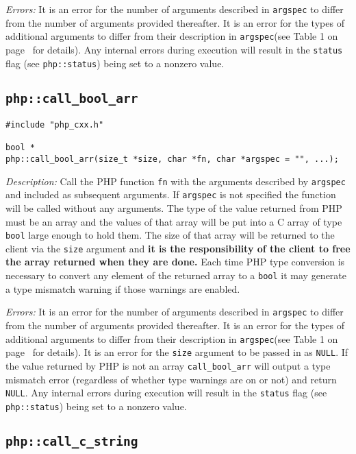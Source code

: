 \documentclass[11pt,titlepage]{article}
\begin{document}
\emph{Errors:} It is an error for the number of arguments described in \verb|argspec| to differ from the number of arguments provided thereafter. It is an error for the types of additional arguments to differ from their description in \verb|argspec|(see Table 1 on page~\pageref{Table1} for details). Any internal errors during execution will result in the \verb|status| flag (see \verb|php::status|) being set to a nonzero value.


\subsection{\texttt{php::call\_bool\_arr}}

\begin{verbatim}
#include "php_cxx.h"

bool *
php::call_bool_arr(size_t *size, char *fn, char *argspec = "", ...);
\end{verbatim}

\emph{Description:} Call the PHP function \verb|fn| with the arguments described by \verb|argspec| and included as subsequent arguments. If \verb|argspec| is not specified the function will be called without any arguments. The type of the value returned from PHP must be an array and the values of that array will be put into a C array of type \verb|bool| large enough to hold them. The size of that array will be returned to the client via the \verb|size| argument and \textbf{it is the responsibility of the client to free the array returned when they are done.} Each time PHP type conversion is necessary to convert any element of the returned array to a \verb|bool| it may generate a type mismatch warning if those warnings are enabled.

\emph{Errors:} It is an error for the number of arguments described in \verb|argspec| to differ from the number of arguments provided thereafter. It is an error for the types of additional arguments to differ from their description in \verb|argspec|(see Table 1 on page~\pageref{Table1} for details). It is an error for the \verb|size| argument to be passed in as \verb|NULL|. If the value returned by PHP is not an array \verb|call_bool_arr| will output a type mismatch error (regardless of whether type warnings are on or not) and  return \verb|NULL|. Any internal errors during execution will result in the \verb|status| flag (see \verb|php::status|) being set to a nonzero value.


\subsection{\texttt{php::call\_c\_string}}
\end{document}
